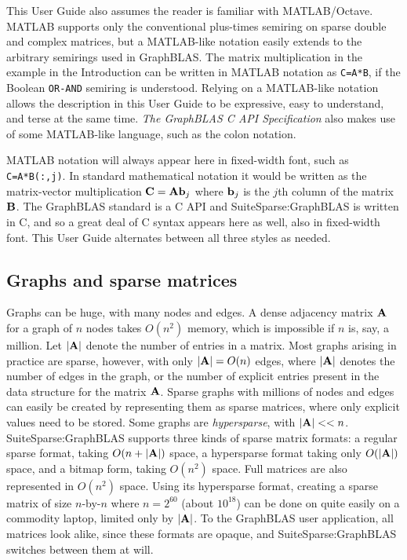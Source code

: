 \documentclass[12pt]{article}
\begin{document}
This User Guide also assumes the reader is familiar with MATLAB/Octave.
MATLAB supports only the conventional plus-times semiring on sparse
double and complex matrices, but a MATLAB-like notation easily extends to the
arbitrary semirings used in GraphBLAS.  The matrix multiplication in the
example in the Introduction can be written in MATLAB notation as
\verb'C=A*B', if the Boolean \verb'OR-AND' semiring is understood.  Relying on
a MATLAB-like notation allows the description in this User Guide to be
expressive, easy to understand, and terse at the same time.  {\em The GraphBLAS
C API Specification} also makes use of some MATLAB-like language, such
as the colon notation.

MATLAB notation will always appear here in fixed-width font, such as
\verb'C=A*B(:,j)'.  In standard mathematical notation it would be written as
the matrix-vector multiplication ${\bf C = A b}_j$ where ${\bf b}_j$ is the
$j$th column of the matrix ${\bf B}$.  The GraphBLAS standard is a C API and
SuiteSparse:GraphBLAS is written in C, and so a great deal of C syntax appears
here as well, also in fixed-width font.  This User Guide alternates between all
three styles as needed.

\subsection{Graphs and sparse matrices} %
\label{sparse}

Graphs can be huge, with many nodes and edges.  A dense adjacency matrix ${\bf
A}$ for a graph of $n$ nodes takes $O(n^2)$ memory, which is impossible if $n$
is, say, a million.  Let $|{\bf A}|$ denote the number of entries in a matrix.
Most graphs arising in practice are sparse, however, with only $|{\bf A}|=O(n)$
edges, where $|{\bf A}|$ denotes the number of edges in the graph, or the
number of explicit entries present in the data structure for the matrix ${\bf
A}$.  Sparse graphs with millions of nodes and edges can easily be created by
representing them as sparse matrices, where only explicit values need to be
stored.  Some graphs are {\em hypersparse}, with ${|\bf A}| << n$.
SuiteSparse:GraphBLAS supports three kinds of sparse matrix formats: a regular
sparse format, taking $O(n+|{\bf A}|)$ space, a hypersparse format taking only
$O(|{\bf A}|)$ space, and a bitmap form, taking $O(n^2)$ space.  Full matrices
are also represented in $O(n^2)$ space.  Using its hypersparse format, creating
a sparse matrix of size $n$-by-$n$ where $n=2^{60}$ (about $10^{18}$) can be
done on quite easily on a commodity laptop, limited only by $|{\bf A}|$.
To the GraphBLAS user application, all matrices look alike, since these formats
are opaque, and SuiteSparse:GraphBLAS switches between them at will.
\end{document}
